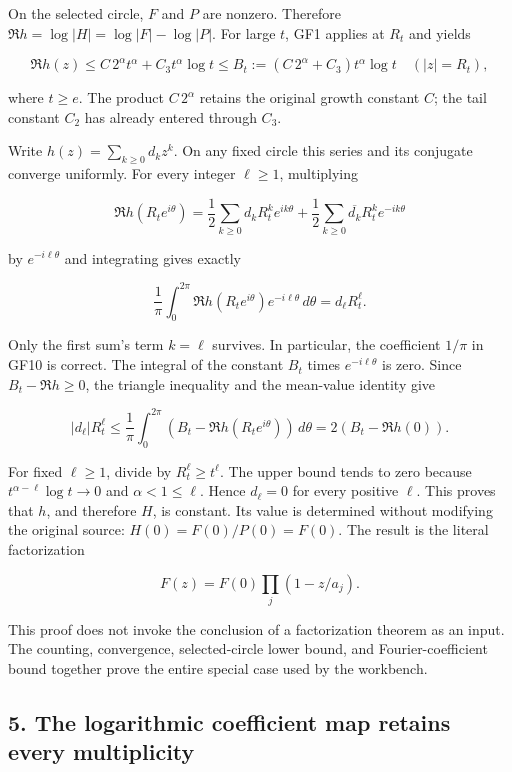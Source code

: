 On the selected circle, \(F\) and \(P\) are nonzero. Therefore \(\Re h=\log|H|=\log|F|-\log|P|\). For large \(t\), GF1 applies at \(R_t\) and yields

\[
\Re h(z)\le C\,2^\alpha t^\alpha+C_3t^\alpha\log t
\le B_t:=(C\,2^\alpha+C_3)t^\alpha\log t
\quad(|z|=R_t),
\tag{GFR16}
\]

where \(t\ge e\). The product \(C\,2^\alpha\) retains the original growth constant \(C\); the tail constant \(C_2\) has already entered through \(C_3\).

Write \(h(z)=\sum_{k\ge0}d_kz^k\). On any fixed circle this series and its conjugate converge uniformly. For every integer \(\ell\ge1\), multiplying

\[
\Re h(R_te^{i\theta})=
\frac12\sum_{k\ge0}d_kR_t^ke^{ik\theta}
+\frac12\sum_{k\ge0}\overline{d_k}R_t^ke^{-ik\theta}
\]

by \(e^{-i\ell\theta}\) and integrating gives exactly

\[
\frac1\pi\int_0^{2\pi}\Re h(R_te^{i\theta})e^{-i\ell\theta}\,d\theta
=d_\ell R_t^\ell.
\tag{GFR17}
\]

Only the first sum's term \(k=\ell\) survives. In particular, the coefficient \(1/\pi\) in GF10 is correct. The integral of the constant \(B_t\) times \(e^{-i\ell\theta}\) is zero. Since \(B_t-\Re h\ge0\), the triangle inequality and the mean-value identity give

\[
|d_\ell|R_t^\ell
\le\frac1\pi\int_0^{2\pi}(B_t-\Re h(R_te^{i\theta}))\,d\theta
=2(B_t-\Re h(0)).
\tag{GFR18}
\]

For fixed \(\ell\ge1\), divide by \(R_t^\ell\ge t^\ell\). The upper bound tends to zero because \(t^{\alpha-\ell}\log t\to0\) and \(\alpha<1\le\ell\). Hence \(d_\ell=0\) for every positive \(\ell\). This proves that \(h\), and therefore \(H\), is constant. Its value is determined without modifying the original source: \(H(0)=F(0)/P(0)=F(0)\). The result is the literal factorization

\[
F(z)=F(0)\prod_j(1-z/a_j).
\tag{GFR19}
\]

This proof does not invoke the conclusion of a factorization theorem as an input. The counting, convergence, selected-circle lower bound, and Fourier-coefficient bound together prove the entire special case used by the workbench.

\subsection{5. The logarithmic coefficient map retains every multiplicity}\label{C47stage:GFR:the-logarithmic-coefficient-map-retains-every-multiplicity}

